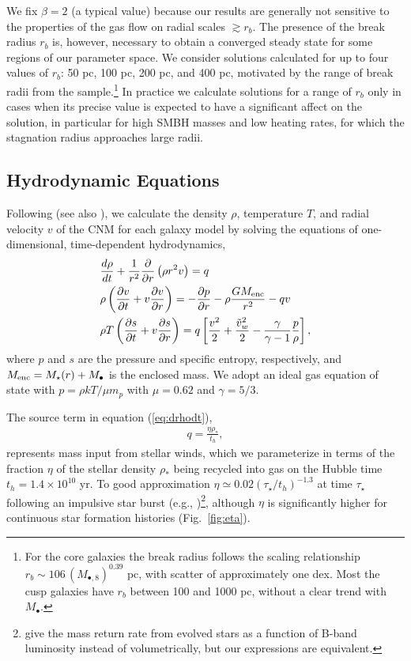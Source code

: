 \documentclass[usenatbib,fleqn]{mn2e}
\newcommand{\rb}{r_b}
\newcommand{\dxdy}[2]{\frac{d #1}{d #2} }
\newcommand{\drhodt}{\dxdy{\rho}{t}}
\newcommand{\ke}{\frac{v^2}{2}}
\newcommand{\kew}{\frac{\tilde{v}_{w}^2}{2}}
\newcommand{\gammaf}{\frac{\gamma}{\gamma-1}}
\newcommand{\cs}{\frac{p}{\rho}}
\newcommand{\rhostar}{\rho_*}
\newcommand{\Mbh}[1][]{M_{\bullet#1}}
\newcommand{\Mbheight}{M_{\bullet,8}}
\renewcommand{\th}{t_h}
\begin{document}
We fix $\beta = 2$ (a typical value) because our results are generally not sensitive to the
properties of the gas flow on radial scales $\gtrsim r_b$. The presence of the break radius $r_{b}$ is, however, necessary to obtain a converged steady state for some regions of our parameter space.  We consider solutions calculated for up to four values of $\rb$: 50 pc, 100 pc, 200 pc, and 400 pc, motivated by the range of break radii from the \citet{LauerFaber+:2007a} sample.\footnote{For the core galaxies the break radius follows the scaling relationship $\rb\sim 106 \, (\Mbheight)^{0.39}$ pc, with scatter of approximately one dex.  Most the cusp galaxies have
$\rb$ between 100 and 1000 pc, without a clear trend with $\Mbh$.}  In practice we calculate solutions for a range of $\rb$ only in cases when its precise value is expected to have a significant affect on the solution, in particular for high SMBH masses and low heating rates, for which the stagnation radius approaches large radii.   


\subsection{Hydrodynamic Equations}
\label{sec:hydro}

Following \citet{Quataert:2004a} (see also \citealt{HolzerAxford:1970a,De-ColleGuillochon+:2012a,ShcherbakovWong+:2014a}), we calculate the density $\rho$, temperature $T$, and radial velocity $v$ of the CNM for each galaxy model by solving the equations of one-dimensional, time-dependent hydrodynamics,
\begin{align}
  &\drhodt+\frac{1}{r^2}\frac{\partial}{\partial r}\left(\rho r^2 v\right)=q \label{eq:drhodt}\\
  &\rho \left(\frac{\partial v}{\partial t} + v\frac{\partial
      v}{\partial r}\right) =-\frac{\partial p}{\partial r}- \rho\frac{GM_{\rm enc}}{r^{2}} -q v \label{eq:dvdt}\\
  &\rho T\left(\frac{\partial s}{\partial t} + v\frac{\partial
      s}{\partial r}\right)=q\left[\ke+\kew-\gammaf \cs \right] 
, 
\label{eq:dsdt}
\end{align}
where $p$ and $s$ are the pressure and specific entropy, respectively, and $M_{\rm enc} = M_{\star}(r) + \Mbh$ is the
enclosed mass.  We adopt an ideal gas equation of state with $p = \rho kT/\mu m_p$ with $\mu = 0.62$  and $\gamma = 5/3$. 

The source term in equation (\ref{eq:drhodt}),
\begin{align}
  q=\frac{\eta \rhostar}{\th},
\label{eq:q}
\end{align}
represents mass input from stellar winds, which we parameterize in
terms of the fraction $\eta$ of the stellar density $\rhostar$ being
recycled into gas on the Hubble time $\th = 1.4 \times 10^{10}$
yr.  To good approximation $\eta\simeq 0.02 (\tau_{\star}/t_h)^{-1.3}$ at time $\tau_{\star}$ following an impulsive star burst (e.g., \citealt{Ciotti+91})\footnote{\citet{Ciotti+91} give the mass return rate from evolved stars as a function of B-band luminosity instead of volumetrically, but our expressions are equivalent.}, although $\eta$ is significantly higher for continuous star formation histories (Fig.~\ref{fig:eta}).  
\end{document}
